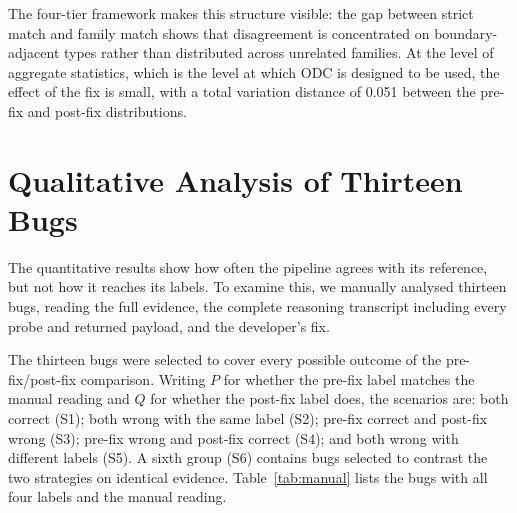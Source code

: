 \documentclass{iutbscthesis}
\begin{document}
The four-tier framework makes this structure visible: the gap between strict match and family match shows that disagreement is concentrated on boundary-adjacent types rather than distributed across unrelated families. At the level of aggregate statistics, which is the level at which ODC is designed to be used, the effect of the fix is small, with a total variation distance of 0.051 between the pre-fix and post-fix distributions.

\section{Qualitative Analysis of Thirteen Bugs}
\label{sec:manual}

The quantitative results show how often the pipeline agrees with its reference, but not how it reaches its labels. To examine this, we manually analysed thirteen bugs, reading the full evidence, the complete reasoning transcript including every probe and returned payload, and the developer's fix.

The thirteen bugs were selected to cover every possible outcome of the pre-fix/post-fix comparison. Writing $P$ for whether the pre-fix label matches the manual reading and $Q$ for whether the post-fix label does, the scenarios are: both correct (S1); both wrong with the same label (S2); pre-fix correct and post-fix wrong (S3); pre-fix wrong and post-fix correct (S4); and both wrong with different labels (S5). A sixth group (S6) contains bugs selected to contrast the two strategies on identical evidence. Table~\ref{tab:manual} lists the bugs with all four labels and the manual reading.
\end{document}
